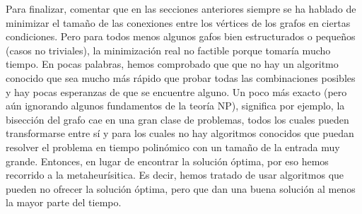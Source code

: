 Para finalizar, comentar que en las secciones anteriores siempre se ha hablado de minimizar el tamaño de las conexiones entre los vértices de los grafos en ciertas condiciones. Pero para todos menos algunos gafos bien estructurados o pequeños (casos no triviales), la minimización real no factible porque tomaría mucho tiempo. En pocas palabras, hemos comprobado que que no hay un algoritmo conocido que sea mucho más rápido que probar todas las combinaciones posibles y hay pocas esperanzas de que se encuentre alguno. Un poco más exacto (pero aún ignorando algunos fundamentos de la teoría NP), significa por ejemplo, la bisección del grafo cae en una gran clase de problemas, todos los cuales pueden transformarse entre sí y para los cuales no hay algoritmos conocidos que puedan resolver el problema en tiempo polinómico con un tamaño de la entrada muy grande. Entonces, en lugar de encontrar la solución óptima, por eso hemos recorrido a la metaheurísitica. Es decir, hemos tratado de usar algoritmos que pueden no ofrecer la solución óptima, pero que dan una buena solución al menos la mayor parte del tiempo. 